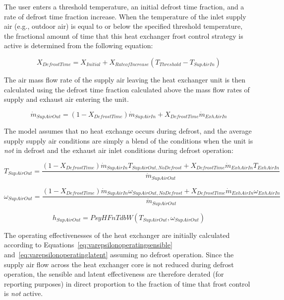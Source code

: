 The user enters a threshold temperature, an initial defrost time fraction, and a rate of defrost time fraction increase. When the temperature of the inlet supply air (e.g., outdoor air) is equal to or below the specified threshold temperature, the fractional amount of time that this heat exchanger frost control strategy is active is determined from the following equation:

\begin{equation}
{X_{DefrostTime}} = {X_{Initial}} + {X_{RateofIncrease}}({T_{Threshold}} - {T_{SupAirIn}})
\end{equation}

The air mass flow rate of the supply air leaving the heat exchanger unit is then calculated using the defrost time fraction calculated above the mass flow rates of supply and exhaust air entering the unit.

\begin{equation}
{\dot{m}_{SupAirOut}} = (1 - {X_{DefrostTime}}){\dot{m}_{SupAirIn}} + {X_{DefrostTime}}{\dot{m}_{ExhAirIn}}
\end{equation}

The model assumes that no heat exchange occurs during defrost, and the average supply supply air conditions are simply a blend of the conditions when the unit is \emph{not} in defrost and the exhaust air inlet conditions during defrost operation:

\begin{equation}
{T_{SupAirOut}} = \frac{{(1 - {X_{DefrostTime}}){{\dot{m}_{SupAirIn}}}{T_{SupAirOut,NoDefrost}} + {X_{DefrostTime}}{{\dot{m}_{ExhAirIn}}}{T_{ExhAirIn}}}}{{{{\dot{m}_{SupAirOut}}}}}
\end{equation}

\begin{equation}
{\omega_{SupAirOut}} = \frac{{(1 - {X_{DefrostTime}}){{\dot{m}_{SupAirIn}}}{\omega_{SupAirOut,NoDefrost}} + {X_{DefrostTime}}{{\dot{m}_{ExhAirIn}}}{\omega_{ExhAirIn}}}}{{{{\dot{m}_{SupAirOut}}}}}
\end{equation}

\begin{equation}
{h_{SupAirOut}} = PsyHFnTdbW({T_{SupAirOut}},{\omega_{SupAirOut}})
\end{equation}

The operating effectivenesses of the heat exchanger are initially calculated according to Equations~\ref{eq:varepsilonoperatingsensible} and~\ref{eq:varepsilonoperatinglatent} assuming no defrost operation. Since the supply air flow across the heat exchanger core is not reduced during defrost operation, the sensible and latent effectiveness are therefore derated (for reporting purposes) in direct proportion to the fraction of time that frost control is \emph{not} active.


